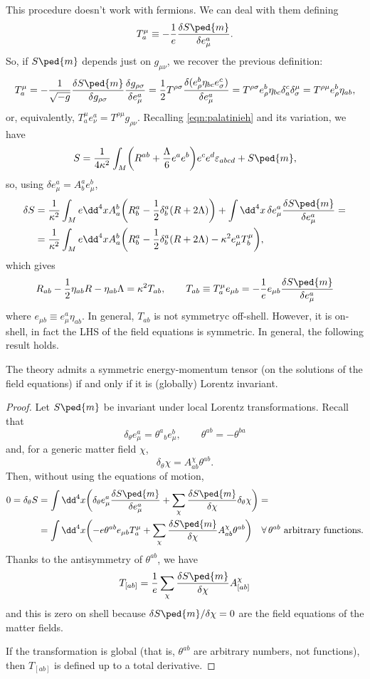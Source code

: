 \documentclass[a4paper,12pt]{book}
\begin{document}
This procedure doesn't work with fermions. We can deal with them defining
\[T^\mu_a\equiv-\frac1e\frac{\delta S\ped{m}}{\delta e^a_\mu}.\]
So, if $S\ped{m}$ depends just on $g_{\mu\nu}$, we recover the previous definition:
\[T^\mu_a=-\frac1{\sqrt{-g}}\frac{\delta S\ped{m}}{\delta g_{\rho\sigma}}\frac{\delta g_{\rho\sigma}}{\delta e^a_\mu}=\frac12T^{\rho\sigma}\frac{\delta(e^b_\rho\eta_{bc}e^c_\sigma)}{\delta e^a_{\mu}}=T^{\rho\sigma}e^b_\rho\eta_{bc}\delta^c_a\delta^\mu_\sigma=T^{\rho\mu}e_\rho^b\eta_{ab},\]
or, equivalently, $T^\mu_ae^a_\nu=T^{\rho\mu}g_{\rho\nu}$. Recalling \cref{eqn:palatinieh} and its variation, we have
\[S=\frac{1}{4\kappa^2}\int_M\biggl(R^{ab}+\frac{\Lambda}{6}e^ae^b\biggr)e^ce^d\varepsilon_{abcd}+S\ped{m},\]
so, using $\delta e^a_\mu=A^a_be^b_\mu$,
\begin{align*}
\delta S&=\frac1{\kappa^2}\int_Me\dd^4xA^b_a\biggl(R^a_b-\frac12\delta^a_b(R+2\Lambda)\biggr)+\int\dd^4x\,\delta e^a_\mu\frac{\delta S\ped{m}}{\delta e^a_\mu}=\\
&=\frac1{\kappa^2}\int_Me\dd^4xA^b_a\biggl(R^a_b-\frac12\delta^a_b(R+2\Lambda)-\kappa^2e^a_\mu T^\mu_b\biggr),
\end{align*}
which gives
\[R_{ab}-\frac12\eta_{ab}R-\eta_{ab}\Lambda=\kappa^2T_{ab},\qquad T_{ab}\equiv T^\mu_ae_{\mu b}=-\frac1ee_{\mu b}\frac{\delta S\ped{m}}{\delta e^a_\mu}\]
where $e_{\mu b}\equiv e^a_\mu\eta_{ab}$. In general, $T_{ab}$ is not symmetryc off-shell. However, it is on-shell, in fact the LHS of the field equations is symmetric. In general, the following result holds.

\begin{theorem}
The theory admits a symmetric energy-momentum tensor (on the solutions of the field equations) if and only if it is (globally) Lorentz invariant.
\end{theorem}
\begin{proof}
Let $S\ped{m}$ be invariant under local Lorentz transformations. Recall that
\[\delta_\theta e^a_\mu=\theta^a{}_be^b_\mu,\qquad \theta^{ab}=-\theta^{ba}\]
and, for a generic matter field $\chi$,
\[\delta_\theta\chi=A^\chi_{ab}\theta^{ab}.\]
Then, without using the equations of motion,
\begin{align*}
0=\delta_\theta S&=\int\dd^4x\biggl(\delta_\theta e^a_\mu\frac{\delta S\ped{m}}{\delta e^a_\mu}+\sum_\chi \frac{\delta S\ped{m}}{\delta\chi}\delta_\theta\chi\biggr)=\\
&=\int\dd^4x\biggl(-e\theta^{ab}e_{\mu b}T^\mu_a+\sum_\chi\frac{\delta S\ped{m}}{\delta\chi}A^\chi_{ab}\theta^{ab}\biggr)\quad\forall\,\theta^{ab}\text{ arbitrary functions.}
\end{align*}
Thanks to the antisymmetry of $\theta^{ab}$, we have
\[T_{[ab]}=\frac1e\sum_\chi\frac{\delta S\ped{m}}{\delta\chi}A^\chi_{[ab]}\]
and this is zero on shell because $\delta S\ped{m}/\delta\chi=0$ are the field equations of the matter fields.

If the transformation is global (that is, $\theta^{ab}$ are arbitrary numbers, not functions), then $T_{[ab]}$ is defined up to a total derivative.
\end{proof}
\end{document}
